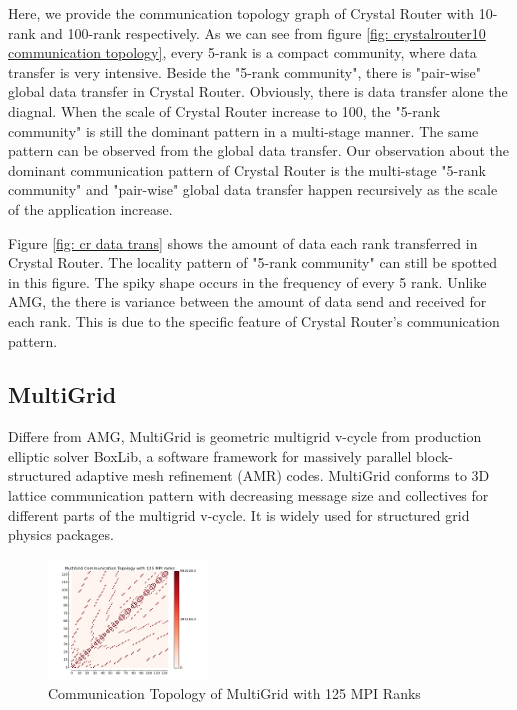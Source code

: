 \documentclass[conference]{IEEEtran}
\begin{document}
Here, we provide the communication topology graph of Crystal Router with 10-rank and 100-rank respectively. As we can see from figure \ref{fig: crystalrouter10 communication topology}, every 5-rank is a compact community, where data transfer is very intensive. Beside the "5-rank community", there is "pair-wise" global data transfer in Crystal Router. Obviously, there is data transfer alone the diagnal. When the scale of Crystal Router increase to 100, the "5-rank community" is still the dominant pattern in a multi-stage manner. The same pattern can be observed from the global data transfer. Our observation about the dominant communication pattern of Crystal Router is the multi-stage "5-rank community" and "pair-wise" global data transfer happen recursively as the scale of the application increase.

Figure \ref{fig: cr data trans} shows the amount of data each rank transferred in Crystal Router. The locality pattern of "5-rank community" can still be spotted in this figure. The spiky shape occurs in the frequency of every 5 rank. Unlike AMG, the there is variance between the amount of data send and received for each rank. This is due to the specific feature of Crystal Router's communication pattern.


\subsection{MultiGrid}
\label{sec:multigrid}

Differe from AMG, MultiGrid is geometric multigrid v-cycle from production elliptic solver BoxLib, a software framework for massively parallel block-structured adaptive mesh refinement (AMR) codes. MultiGrid conforms to 3D lattice communication pattern with decreasing message size and collectives for different parts of the multigrid v-cycle. It is widely used for structured grid physics packages.

\begin{figure}[h!] 
  \centering
  \includegraphics[width=0.38\textwidth]{figs/appstudy/mg/mg125_ct}
   \caption{Communication Topology of MultiGrid with 125 MPI Ranks }
   \label{fig: multigrid125 communication topology}
\end{figure}
\end{document}

